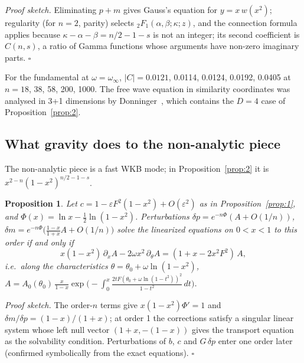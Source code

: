 \documentclass[aps,prd,onecolumn,superscriptaddress,nofootinbib,10pt]{revtex4-2}
\newcommand{\eps}{\varepsilon}
\newtheorem{proposition}{Proposition}
\begin{document}
\emph{Proof sketch.} Eliminating $p+m$ gives Gauss's equation for $y = x\,w(x^2)$; regularity (for $n = 2$, parity)
selects ${}_2F_1(\alpha,\beta;\kappa;z)$, and the connection formula~\cite{AbramowitzStegun} applies because
$\kappa - \alpha - \beta = n/2 - 1 - s$ is not an integer; its second coefficient is $C(n,s)$, a ratio of Gamma functions
whose arguments have non-zero imaginary parts. $\square$

For the fundamental at $\omega = \omega_\infty$, $|C| = 0.0121$, 0.0114, 0.0124, 0.0192, 0.0405 at $n = 18$, 38, 58, 200,
1000. The free wave equation in similarity coordinates was analysed in 3+1 dimensions by Donninger~\cite{Donninger2008},
which contains the $D = 4$ case of Proposition~\ref{prop:2}.

\subsection{What gravity does to the non-analytic piece}

The non-analytic piece is a fast WKB mode; in Proposition~\ref{prop:2} it is $x^{2-n}(1-x^2)^{n/2-1-s}$.

\begin{proposition}\label{prop:3}
Let $c = 1 - \eps F^2(1-x^2) + O(\eps^2)$ as in Proposition~\ref{prop:1}, and
$\Phi(x) = \ln x - \tfrac12\ln(1-x^2)$. Perturbations
$\delta p = e^{-n\Phi}(A + O(1/n))$, $\delta m = e^{-n\Phi}\big(\tfrac{1-x}{1+x}A + O(1/n)\big)$ solve the linearized
equations on $0 < x < 1$ to this order if and only if
\begin{equation}
x(1-x^2)\,\partial_xA - 2\omega x^2\,\partial_\theta A = (1 + x - 2x^2F^2)\,A ,
\end{equation}
i.e.\ along the characteristics $\theta = \theta_0 + \omega\ln(1-x^2)$,
$A = A_0(\theta_0)\,\frac{x}{1-x}\exp\!\big(-\int_0^x \frac{2tF(\theta_0 + \omega\ln(1-t^2))^2}{1-t^2}\,dt\big)$.
\end{proposition}

\emph{Proof sketch.} The order-$n$ terms give $x(1-x^2)\Phi' = 1$ and $\delta m/\delta p = (1-x)/(1+x)$; at order 1 the
corrections satisfy a singular linear system whose left null vector $(1+x, -(1-x))$ gives the transport equation as the
solvability condition. Perturbations of $b$, $c$ and $G\,\delta p$ enter one order later (confirmed symbolically from the
exact equations). $\square$
\end{document}
